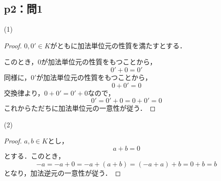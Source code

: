 \documentclass[a4paper,10pt,fleqn]{ltjsarticle}
\begin{document}
\subsection*{p2：問1}

\begin{itembox}[c]{(1)}
    \begin{proof}
$0,0' \in K$がともに加法単位元の性質を満たすとする．

このとき，$0$が加法単位元の性質をもつことから，
\[
    0'+0=0'
\]
同様に，$0'$が加法単位元の性質をもつことから，
\[
    0+0' = 0
\]
交換律より，$0+0'=0'+0$なので，
\[
    0'=0'+0 =0+0' =0
\]
これからただちに加法単位元の一意性が従う．
    \end{proof}
    \end{itembox}
    \begin{itembox}[c]{(2)}
        \begin{proof}
$a ,b \in K$とし，
\[
    a+b =0
\]
とする．このとき，
\[
    -a = -a+0 = -a +(a+b)=(-a+a)+b =0+b = b
\]
となり，加法逆元の一意性が従う．
        \end{proof}
    \end{itembox}
\end{document}
